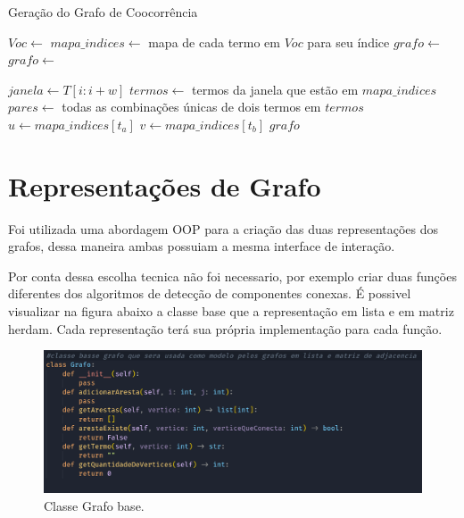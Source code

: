 \documentclass[12pt]{article}
\begin{document}
\begin{algorithm}[H]
\caption{Geração do Grafo de Coocorrência}
\begin{algorithmic}[1]
    \State $Voc \gets$ 
    \State $mapa\_indices \gets$ mapa de cada termo em $Voc$ para seu índice
        \State $grafo \gets$ 
    \Else
        \State $grafo \gets$ 
    \EndIf

            \State $janela \gets T[i:i+w]$
            \State $termos \gets$ termos da janela que estão em $mapa\_indices$
            \State $pares \gets$ todas as combinações únicas de dois termos em $termos$
                \State $u \gets mapa\_indices[t_a]$
                \State $v \gets mapa\_indices[t_b]$
                    \State {}
                \EndIf
            \EndFor
        \EndFor
    \EndFor
    \State \Return $grafo$
\EndFunction
\end{algorithmic}
\end{algorithm}



\section{Representações de Grafo}

Foi utilizada uma abordagem OOP para a criação das duas representações dos grafos, dessa maneira ambas possuiam a mesma interface de interação.

Por conta dessa escolha tecnica não foi necessario, por exemplo criar duas funções diferentes dos algoritmos de detecção de componentes conexas. É possivel visualizar na figura abaixo a classe base que a representação em lista e em matriz herdam. Cada representação terá sua própria implementação para cada função.

\begin{figure}[H]
    \centering
    \includegraphics[width=1\textwidth]{classBase.png}
    \caption{Classe Grafo base.}
\end{figure}
\end{document}
